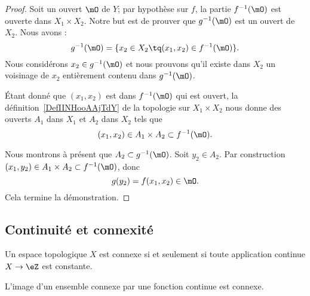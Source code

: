 \begin{proof}
    Soit un ouvert \( \mO\) de \( Y\); par hypothèse sur \( f\), la partie \( f^{-1}(\mO)\) est ouverte dans \( X_1\times X_2\). Notre but est de prouver que \( g^{-1}(\mO)\) est un ouvert de \( X_2\). Nous avons :
    \begin{equation}
        g^{-1}(\mO)=\{ x_2\in X_2\tq (x_1,x_2)\in f^{-1}(\mO) \}.
    \end{equation}
    Nous considérons \( x_2\in g^{-1}(\mO)\) et nous prouvons qu'il existe dans \( X_2\) un voisinage de \( x_2\) entièrement contenu dans \( g^{-1}(\mO)\).

    Étant donné que \( (x_1,x_2)\) est dans \( f^{-1}(\mO)\) qui est ouvert, la définition~\ref{DefIINHooAAjTdY} de la topologie sur \( X_1\times X_2\) nous donne des ouverts \( A_1\) dans \( X_1\) et \( A_2\) dans \( X_2\) tels que
    \begin{equation}
        (x_1,x_2)\in A_1\times A_2\subset f^{-1}(\mO).
    \end{equation}

    Nous montrons à présent que \( A_2\subset g^{-1}(\mO)\). Soit \( y_2\in A_2\). Par construction \( (x_1,y_2)\in A_1\times A_2\subset f^{-1}(\mO)\), donc
    \begin{equation}
        g(y_2)=f(x_1,x_2)\in \mO.
    \end{equation}
    Cela termine la démonstration.
\end{proof}

\subsection{Continuité et connexité}

\begin{proposition} \label{PropConnexiteViaFonction}
  Un espace topologique \( X \) est connexe si et seulement si toute application continue \( X\to \eZ\) est constante.
\end{proposition}

\begin{proposition}\label{PropGWMVzqb}
    L'image d'un ensemble connexe par une fonction continue est connexe.
\end{proposition}

